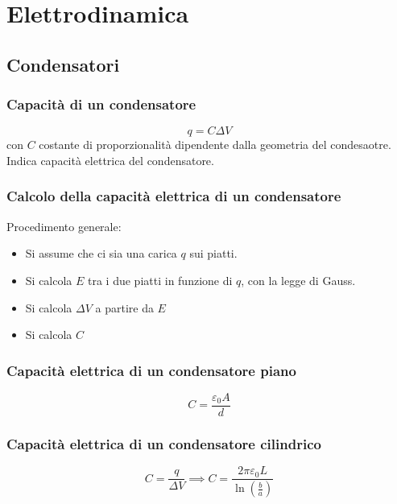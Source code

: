 \chapter*{Elettrodinamica}

    \section*{Condensatori}
        \subsection*{Capacità di un condensatore}
            \begin{equation*}
                q = C\Delta V
            \end{equation*}
        con $C$ costante di proporzionalità dipendente dalla geometria del 
        condesaotre. Indica capacità elettrica del condensatore.
        
        \subsection*{Calcolo della capacità elettrica di un condensatore} 
        Procedimento generale:
            \begin{itemize}
                \item Si assume che ci sia una carica $q$ sui piatti.
                \item Si calcola $E$ tra i due piatti in funzione di $q$, con 
                la legge di Gauss.
                \item Si calcola $\Delta V$ a partire da $E$
                \item Si calcola $C$
            \end{itemize}
        
        \subsection*{Capacità elettrica di un condensatore piano}
            \begin{equation*}
                C = \frac{\varepsilon_0A}{d}
            \end{equation*}

        \subsection*{Capacità elettrica di un condensatore cilindrico}
            \begin{equation*}
                C = \frac{q}{\Delta V} \implies C = \frac{2\pi\varepsilon_0L}
                {\ln(\frac{b}{a})}
            \end{equation*}


